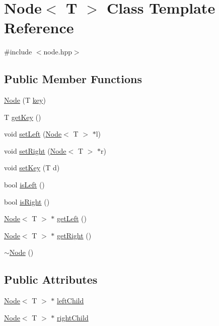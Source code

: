 \hypertarget{classNode}{}\section{Node$<$ T $>$ Class Template Reference}
\label{classNode}


{\ttfamily \#include $<$node.\+hpp$>$}

\subsection*{Public Member Functions}
\begin{DoxyCompactItemize}
\item 
\hyperlink{classNode_a46dceddf91d9d3c68f941333ae1a7dc1}{Node} (T \hyperlink{classNode_a9d5e5c1914f5ed67389740354a607527}{key})
\item 
T \hyperlink{classNode_a3c04afa4e4c8e555cc87a22757ab5f6a}{get\+Key} ()
\item 
void \hyperlink{classNode_afc70e20117ea8083d11736f5ea8a9216}{set\+Left} (\hyperlink{classNode}{Node}$<$ T $>$ $\ast$l)
\item 
void \hyperlink{classNode_ad5c1f634547b3e2d03c3d55d355c0c17}{set\+Right} (\hyperlink{classNode}{Node}$<$ T $>$ $\ast$r)
\item 
void \hyperlink{classNode_a3162a541ae436cd98d61750f07f274b2}{set\+Key} (T d)
\item 
bool \hyperlink{classNode_a906ae0e0b015275eacf168ef55017f7f}{is\+Left} ()
\item 
bool \hyperlink{classNode_a983178a46cc464ca0738ee8c7d8b2cc4}{is\+Right} ()
\item 
\hyperlink{classNode}{Node}$<$ T $>$ $\ast$ \hyperlink{classNode_a1c884e62ef0a9b5dd4f35dbea09145f2}{get\+Left} ()
\item 
\hyperlink{classNode}{Node}$<$ T $>$ $\ast$ \hyperlink{classNode_af9078f2651b16fc1a3502d7927761df1}{get\+Right} ()
\item 
\hyperlink{classNode_ae923d0417581dd19784d55b901f0f7f0}{$\sim$\+Node} ()
\end{DoxyCompactItemize}
\subsection*{Public Attributes}
\begin{DoxyCompactItemize}
\item 
\hyperlink{classNode}{Node}$<$ T $>$ $\ast$ \hyperlink{classNode_a2eaaeffaeef97da6291b788fa131c9ec}{left\+Child}
\item 
\hyperlink{classNode}{Node}$<$ T $>$ $\ast$ \hyperlink{classNode_a625cff56d169157a568afaedbb11576b}{right\+Child}
\end{DoxyCompactItemize}
